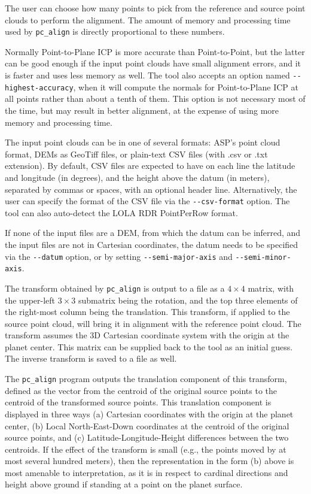 The user can choose how many points to pick from the reference and
source point clouds to perform the alignment. The amount of memory and
processing time used by \texttt{pc\_align} is directly proportional to
these numbers.

Normally Point-to-Plane ICP is more accurate than Point-to-Point, but
the latter can be good enough if the input point clouds have small
alignment errors, and it is faster and uses less memory as well.  The
tool also accepts an option named \texttt{-\/-highest-accuracy}, when it
will compute the normals for Point-to-Plane ICP at all points rather
than about a tenth of them. This option is not necessary most of the
time, but may result in better alignment, at the expense of using more
memory and processing time.

The input point clouds can be in one of several formats: ASP's point
cloud format, DEMs as GeoTiff files, or plain-text CSV files (with .csv
or .txt extension). By default, CSV files are expected to have on each
line the latitude and longitude (in degrees), and the height above the datum
(in meters), separated by commas or spaces, with an optional header
line. Alternatively, the user can specify the format of the CSV file via
the \texttt{-\/-csv-format} option. The tool can also auto-detect the
LOLA RDR PointPerRow format.

If none of the input files are a DEM, from which the datum can be
inferred, and the input files are not in Cartesian coordinates, the
datum needs to be specified via the \texttt{-\/-datum} option, or by
setting \texttt{-\/-semi-major-axis} and \texttt{-\/-semi-minor-axis}.

The transform obtained by \texttt{pc\_align} is output to a file as a
$4\times 4$ matrix, with the upper-left $3\times 3$ submatrix being the
rotation, and the top three elements of the right-most column being the
translation. This transform, if applied to the source point cloud, will
bring it in alignment with the reference point cloud. The transform
assumes the 3D Cartesian coordinate system with the origin at the planet
center. This matrix can be supplied back to the tool as an initial
guess. The inverse transform is saved to a file as well.

The \texttt{pc\_align} program outputs the translation component of this
transform, defined as the vector from the centroid of the original
source points to the centroid of the transformed source points. This
translation component is displayed in three ways (a) Cartesian
coordinates with the origin at the planet center, (b) Local
North-East-Down coordinates at the centroid of the original source
points, and (c) Latitude-Longitude-Height differences between the two
centroids. If the effect of the transform is small (e.g., the points
moved by at most several hundred meters), then the representation in the
form (b) above is most amenable to interpretation, as it is in respect
to cardinal directions and height above ground if standing at a point on
the planet surface.

